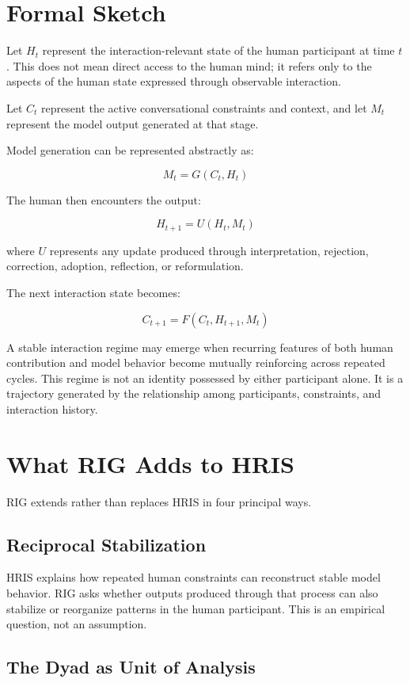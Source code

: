 \documentclass[12pt]{article}
\begin{document}
\section{Formal Sketch}

Let $H_t$ represent the interaction-relevant state of the human participant at time $t$. This does not mean direct access to the human mind; it refers only to the aspects of the human state expressed through observable interaction.

Let $C_t$ represent the active conversational constraints and context, and let $M_t$ represent the model output generated at that stage.

Model generation can be represented abstractly as:

\[
M_t = G(C_t, H_t)
\]

The human then encounters the output:

\[
H_{t+1} = U(H_t, M_t)
\]

where $U$ represents any update produced through interpretation, rejection, correction, adoption, reflection, or reformulation.

The next interaction state becomes:

\[
C_{t+1} = F(C_t, H_{t+1}, M_t)
\]

A stable interaction regime may emerge when recurring features of both human contribution and model behavior become mutually reinforcing across repeated cycles. This regime is not an identity possessed by either participant alone. It is a trajectory generated by the relationship among participants, constraints, and interaction history.

\section{What RIG Adds to HRIS}

RIG extends rather than replaces HRIS in four principal ways.

\subsection{Reciprocal Stabilization}

HRIS explains how repeated human constraints can reconstruct stable model behavior. RIG asks whether outputs produced through that process can also stabilize or reorganize patterns in the human participant. This is an empirical question, not an assumption.

\subsection{The Dyad as Unit of Analysis}
\end{document}
